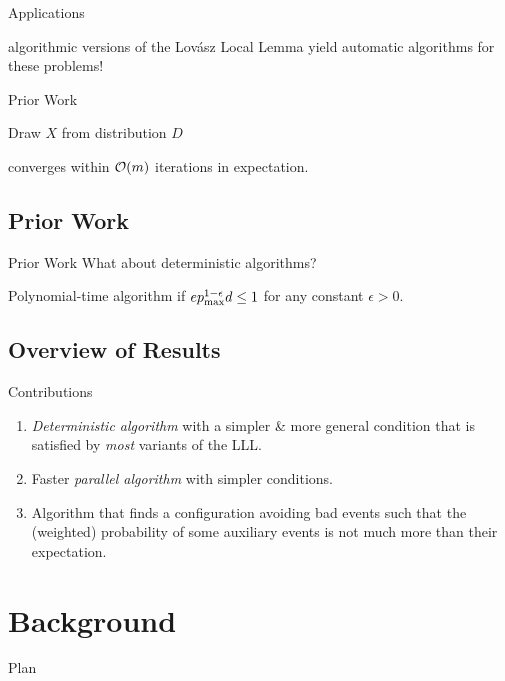 \documentclass{beamer}
\begin{document}
\begin{frame}{Applications}

\follows algorithmic versions of the Lovász Local Lemma yield automatic algorithms for these problems!
\end{frame}

\begin{frame}{Prior Work}
\begin{algorithm}[H]
    Draw $X$ from distribution $D$\;
\end{algorithm}\pause
\follows converges within $\mathcal{O}(m)$ iterations in expectation.
\end{frame}

\subsection{Prior Work}
\begin{frame}{Prior Work}
What about deterministic algorithms?\pause\par
Polynomial-time algorithm if $e p_\mathrm{max}^{1-\epsilon} d \leq 1$ for any constant $\epsilon > 0$.

\end{frame}

\subsection{Overview of Results}
\begin{frame}{Contributions}
\begin{enumerate}
    \item \emph{Deterministic algorithm} with a simpler \& more general condition that is satisfied by \emph{most} variants of the LLL.\pause
    \item Faster \emph{parallel algorithm} with simpler conditions.\pause
    \item Algorithm that finds a configuration avoiding bad events such that the (weighted) probability of some auxiliary events is not much more than their expectation.
\end{enumerate}
\end{frame}

\section{Background}
\begin{frame}{Plan}
\tableofcontents[currentsection, sectionstyle=show/shaded, hideothersubsections]
\end{frame}
\end{document}
